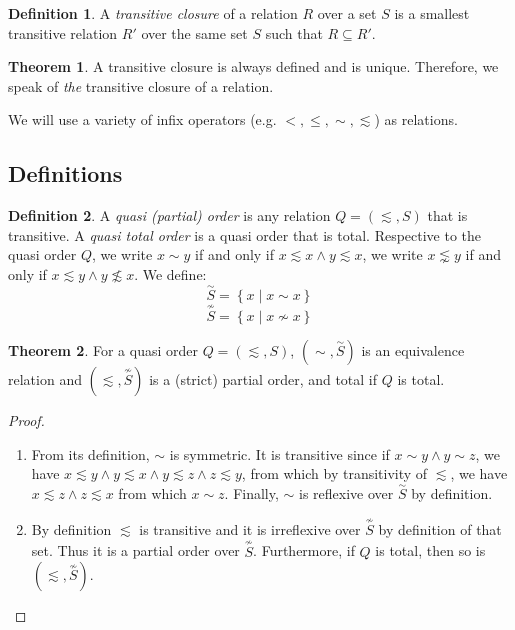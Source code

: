 \documentclass[12pt]{article}
\theoremstyle{definition}
\newtheorem{definition}{Definition}[section]
\theoremstyle{theorem}
\newtheorem{theorem}{Theorem}[section]
\def\aset#1{\left\{{#1}\right\}}
\begin{document}
\begin{definition}
    A \emph{transitive closure} of a relation $R$ over a set $S$ is a
    smallest transitive relation $R'$ over the same set $S$ such that
    $R \subseteq R'$.
\end{definition}
\begin{theorem}
  A transitive closure is always defined and is unique.  Therefore, we
  speak of \emph{the} transitive closure of a relation.
\end{theorem}

We will use a variety of infix operators (e.g. \( <, \leq, \sim, \lesssim \)) as relations. 

\subsection{Definitions}

\def\SimHat#1{\stackrel{\sim}{#1}}
\def\NotSimHat#1{\stackrel{\not\sim}{#1}}

\begin{definition}
  A \emph{quasi (partial) order} is any relation $Q=(\lesssim,S)$ that is transitive.
  A \emph{quasi total order} is a quasi order that is total.
  Respective to the quasi order $Q$, we write \( x \sim y \) if and only if \( x \lesssim x \wedge y \lesssim x \), we write \( x \lnsim y \) if and only if \( x \lesssim y \wedge y \not\lesssim x \).  We define:
  \[ \SimHat{S} = \aset{x \mid x \sim x} \]
  \[ \NotSimHat{S} = \aset{x \mid x \not\sim x } \]
\end{definition}
\begin{theorem}
  For a quasi order $Q=(\lesssim,S)$, \((\sim,\SimHat{S})\) is an equivalence relation and 
  \((\lesssim,\NotSimHat{S})\) is a (strict) partial order, and total
  if $Q$ is total.
\end{theorem}
\begin{proof}
  
  \verb| |
  
  \begin{enumerate}
    \item
      From its definition, $\sim$ is symmetric.  It is transitive since if
      \( x \sim y \wedge y \sim z \), we have \( x \lesssim y \wedge y
      \lesssim x \wedge y \lesssim z \wedge z \lesssim y \), from which
      by transitivity of $\lesssim$, we have \( x \lesssim z \wedge z
      \lesssim x \) from which \( x \sim z \).  Finally, $\sim$ is
      reflexive over \(\SimHat{S}\) by definition.
    \item
      By definition $\lesssim$ is transitive and it is irreflexive over
      $\NotSimHat{S}$ by definition of that set.  Thus it is a partial
      order over $\NotSimHat{S}$.  Furthermore, if $Q$ is total, then
      so is \((\lesssim,\NotSimHat{S})\).
  \end{enumerate}
\end{proof}
\end{document}
